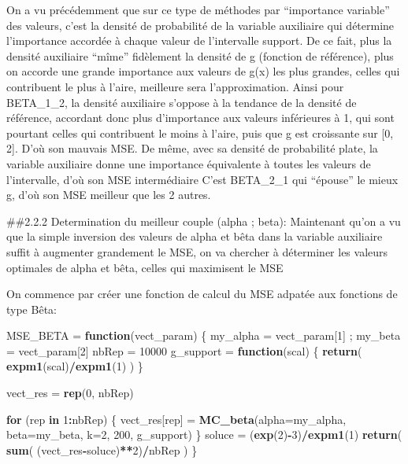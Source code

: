 \documentclass[]{article}
\newenvironment{Shaded}{\begin{snugshade}}{\end{snugshade}}
\newcommand{\ControlFlowTok}[1]{\textcolor[rgb]{0.13,0.29,0.53}{\textbf{#1}}}
\newcommand{\DataTypeTok}[1]{\textcolor[rgb]{0.13,0.29,0.53}{#1}}
\newcommand{\DecValTok}[1]{\textcolor[rgb]{0.00,0.00,0.81}{#1}}
\newcommand{\KeywordTok}[1]{\textcolor[rgb]{0.13,0.29,0.53}{\textbf{#1}}}
\newcommand{\NormalTok}[1]{#1}
\newcommand{\OperatorTok}[1]{\textcolor[rgb]{0.81,0.36,0.00}{\textbf{#1}}}
\newcommand{\StringTok}[1]{\textcolor[rgb]{0.31,0.60,0.02}{#1}}
\begin{document}
On a vu précédemment que sur ce type de méthodes par ``importance
variable'' des valeurs, c'est la densité de probabilité de la variable
auxiliaire qui détermine l'importance accordée à chaque valeur de
l'intervalle support. De ce fait, plus la densité auxiliaire ``mîme''
fidèlement la densité de g (fonction de référence), plus on accorde une
grande importance aux valeurs de g(x) les plus grandes, celles qui
contribuent le plus à l'aire, meilleure sera l'approximation. Ainsi pour
BETA\_1\_2, la densité auxiliaire s'oppose à la tendance de la densité
de référence, accordant donc plus d'importance aux valeurs inférieures à
1, qui sont pourtant celles qui contribuent le moins à l'aire, puis que
g est croissante sur {[}0, 2{]}. D'où son mauvais MSE. De même, avec sa
densité de probabilité plate, la variable auxiliaire donne une
importance équivalente à toutes les valeurs de l'intervalle, d'où son
MSE intermédiaire C'est BETA\_2\_1 qui ``épouse'' le mieux g, d'où son
MSE meilleur que les 2 autres.

\#\#2.2.2 Determination du meilleur couple (alpha ; beta): Maintenant
qu'on a vu que la simple inversion des valeurs de alpha et bêta dans la
variable auxiliaire suffit à augmenter grandement le MSE, on va chercher
à déterminer les valeurs optimales de alpha et bêta, celles qui
maximisent le MSE

On commence par créer une fonction de calcul du MSE adpatée aux
fonctions de type Bêta:

\begin{Shaded}
\begin{Highlighting}[]
\NormalTok{MSE_BETA =}\StringTok{ }\ControlFlowTok{function}\NormalTok{(vect_param)}
\NormalTok{\{}
\NormalTok{  my_alpha =}\StringTok{ }\NormalTok{vect_param[}\DecValTok{1}\NormalTok{] ; my_beta =}\StringTok{ }\NormalTok{vect_param[}\DecValTok{2}\NormalTok{]}
\NormalTok{  nbRep =}\StringTok{ }\DecValTok{10000}
\NormalTok{  g_support =}\StringTok{ }\ControlFlowTok{function}\NormalTok{(scal) \{ }\KeywordTok{return}\NormalTok{( }\KeywordTok{expm1}\NormalTok{(scal)}\OperatorTok{/}\KeywordTok{expm1}\NormalTok{(}\DecValTok{1}\NormalTok{) ) \}}
  
\NormalTok{  vect_res =}\StringTok{ }\KeywordTok{rep}\NormalTok{(}\DecValTok{0}\NormalTok{, nbRep)}
  
  \ControlFlowTok{for}\NormalTok{ (rep }\ControlFlowTok{in} \DecValTok{1}\OperatorTok{:}\NormalTok{nbRep)}
\NormalTok{  \{}
\NormalTok{    vect_res[rep] =}\StringTok{ }\KeywordTok{MC_beta}\NormalTok{(}\DataTypeTok{alpha=}\NormalTok{my_alpha, }\DataTypeTok{beta=}\NormalTok{my_beta, }
                            \DataTypeTok{k=}\DecValTok{2}\NormalTok{, }\DecValTok{200}\NormalTok{, g_support)  }
\NormalTok{  \}}
\NormalTok{  soluce =}\StringTok{ }\NormalTok{(}\KeywordTok{exp}\NormalTok{(}\DecValTok{2}\NormalTok{)}\OperatorTok{-}\DecValTok{3}\NormalTok{)}\OperatorTok{/}\KeywordTok{expm1}\NormalTok{(}\DecValTok{1}\NormalTok{)}
  \KeywordTok{return}\NormalTok{( }\KeywordTok{sum}\NormalTok{( (vect_res}\OperatorTok{-}\NormalTok{soluce)}\OperatorTok{**}\DecValTok{2}\NormalTok{)}\OperatorTok{/}\NormalTok{nbRep )}
\NormalTok{\}}
\end{Highlighting}
\end{Shaded}
\end{document}
